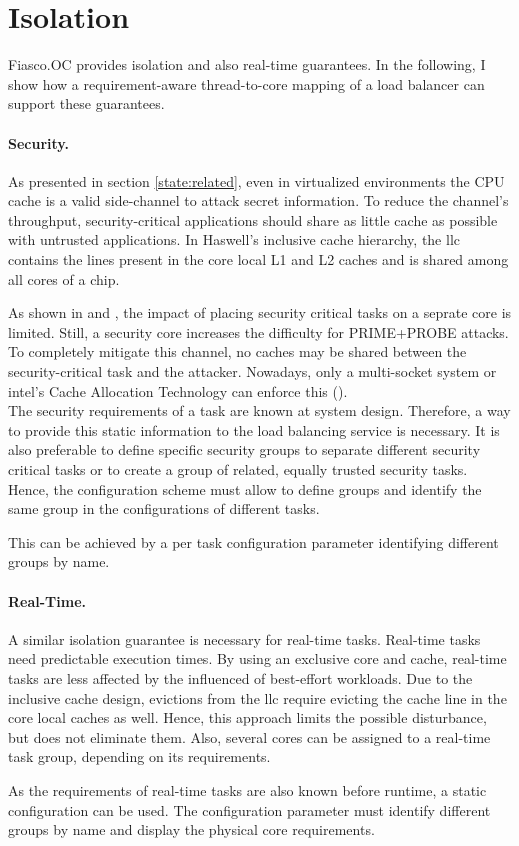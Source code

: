 \section{Isolation}
\label{design:isolation}

Fiasco.OC provides isolation and also real-time guarantees.
In the following, I show how a requirement-aware thread-to-core mapping of a
load balancer can support these guarantees.

\paragraph{Security.}
As presented in section \ref{state:related}, even in virtualized environments
the CPU cache is a valid side-channel to attack secret information.
To reduce the channel's throughput, security-critical applications should share
as little cache as possible with untrusted applications.
In Haswell's inclusive cache hierarchy, the \gls{llc} contains the lines
present in the core local L1 and L2 caches and is shared among all cores of a
chip.

As shown in \cite{inci_seriously_2015} and \cite{liu_last-level_2015},
the impact of placing security critical tasks on a seprate core is limited.
Still, a security core increases the difficulty for PRIME+PROBE attacks.
To completely mitigate this channel, no caches may be shared between the
security-critical task and the attacker.
Nowadays, only a multi-socket system or \gls{intel}'s Cache Allocation
Technology can enforce this (\cite{intel_cat}).
\\

The security requirements of a task are known at system design.
Therefore, a way to provide this static information to the load balancing
service is necessary.
It is also preferable to define specific security groups to separate different
security critical tasks or to create a group of related, equally trusted
security tasks.
Hence, the configuration scheme must allow to define groups and identify the
same group in the configurations of different tasks.

This can be achieved by a per task configuration parameter identifying
different groups by name.


\paragraph{Real-Time.}
A similar isolation guarantee is necessary for real-time tasks.
Real-time tasks need predictable execution times.
By using an exclusive core and cache, real-time tasks are less affected by the
influenced of best-effort workloads.
Due to the inclusive cache design, evictions from the \gls{llc} require
evicting the cache line in the core local caches as well.
Hence, this approach limits the possible disturbance, but does not eliminate them.
Also, several cores can be assigned to a real-time task group, depending on its
requirements.

As the requirements of real-time tasks are also known before runtime, a static
configuration can be used.
The configuration parameter must identify different groups by name
and display the physical core requirements.
